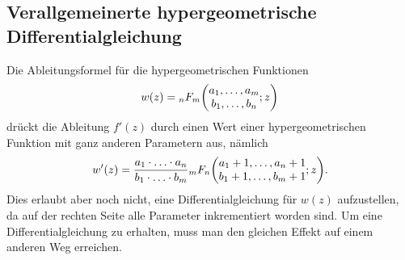 \subsection{Verallgemeinerte hypergeometrische Differentialgleichung}
Die Ableitungsformel für die hypergeometrischen Funktionen
\[
w(z)
=
\mathstrut_nF_m
\biggl(\begin{matrix}a_1,\dots,a_m\\b_1,\dots,b_n\end{matrix};z\biggr)
\]
drückt die Ableitung $f'(z)$ durch einen Wert einer hypergeometrischen
Funktion mit ganz anderen Parametern aus, nämlich
\[
w'(z)
=
\frac{a_1\cdot\ldots\cdot a_n}{b_1\cdot\ldots\cdot b_m}
\mathstrut_mF_n\biggl(
\begin{matrix}a_1+1,\dots,a_n+1\\b_1+1,\dots,b_m+1\end{matrix};z
\biggr).
\]
Dies erlaubt aber noch nicht, eine Differentialgleichung für $w(z)$
aufzustellen, da auf der rechten Seite alle Parameter inkrementiert
worden sind.
Um eine Differentialgleichung zu erhalten, muss man den gleichen
Effekt auf einem anderen Weg erreichen.

